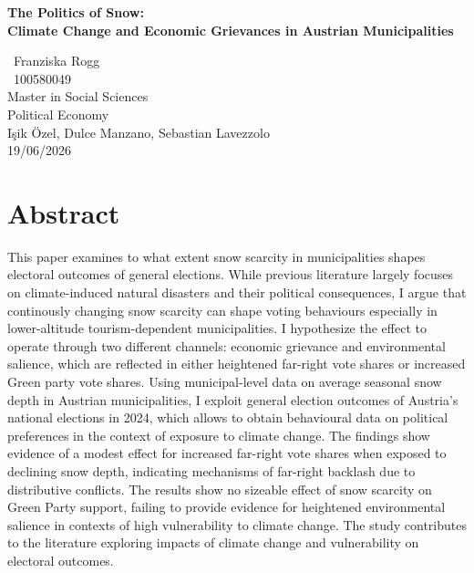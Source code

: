\documentclass{article}
\begin{document}
\begin{titlepage}
  \centering
  \vspace*{3cm}

  {\large\bfseries The Politics of Snow:\\ 
  Climate Change and Economic Grievances in Austrian Municipalities}

  \vspace{4cm}

  {\normalsize\ Franziska Rogg}\\
  {\normalsize\ 100580049}\\
  {\normalsize Master in Social Sciences}\\
  {\normalsize Political Economy}\\
  {\normalsize I\c{s}ik Özel, Dulce Manzano, Sebastian Lavezzolo}\\
  {\normalsize 19/06/2026}

\end{titlepage}
\section*{Abstract}
\noindent 
This paper examines to what extent snow scarcity in municipalities shapes electoral outcomes of general elections. While previous literature largely focuses on climate-induced natural disasters and their political consequences, I argue that continously changing snow scarcity can shape voting behaviours especially in lower-altitude tourism-dependent municipalities. I hypothesize the effect to operate through two different channels: economic grievance and environmental salience, which are reflected in either heightened far-right vote shares or increased Green party vote shares. Using municipal-level data on average seasonal snow depth in Austrian municipalities, I exploit general election outcomes of Austria's national elections in 2024, which allows to obtain behavioural data on political preferences in the context of exposure to climate change. The findings show evidence of a modest effect for increased far-right vote shares when exposed to declining snow depth, indicating mechanisms of far-right backlash due to distributive conflicts. The results show no sizeable effect of snow scarcity on Green Party support, failing to provide evidence for heightened environmental salience in contexts of high vulnerability to climate change. 
The study contributes to the literature exploring impacts of climate change and vulnerability on electoral outcomes. 
\vspace{2em}
\end{document}

